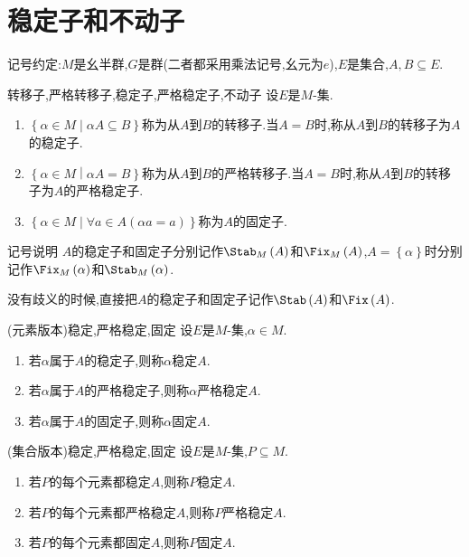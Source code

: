 \section{稳定子和不动子}

记号约定:$M$是幺半群,$G$是群(二者都采用乘法记号,幺元为$e$),$E$是集合,$A,B\subseteq E$.

\begin{definition}{转移子,严格转移子,稳定子,严格稳定子,不动子}{}
	设$E$是$M$-集.
	\begin{enumerate}
		\item $\left\{\alpha\in M\middle|\alpha A\subseteq B\right\}$称为从$A$到$B$的转移子.当$A=B$时,称从$A$到$B$的转移子为$A$的稳定子.
		\item $\left\{\alpha\in M\middle|\alpha A=B\right\}$称为从$A$到$B$的严格转移子.当$A=B$时,称从$A$到$B$的转移子为$A$的严格稳定子.
		\item $\left\{\alpha\in M\middle|\forall a\in A\left(\alpha a=a\right)\right\}$称为$A$的固定子.
	\end{enumerate}
\end{definition}

\begin{remark}{记号说明}{}
	$A$的稳定子和固定子分别记作$\Stab_{M}\left(A\right)$和$\Fix_{M}\left(A\right)$,$A=\left\{\alpha\right\}$时分别记作$\Fix_{M}\left(\alpha\right)$和$\Stab_{M}\left(\alpha\right)$.
	
	没有歧义的时候,直接把$A$的稳定子和固定子记作$\Stab\left(A\right)$和$\Fix\left(A\right)$.
\end{remark}

\begin{definition}{(元素版本)稳定,严格稳定,固定}{}
	设$E$是$M$-集,$\alpha\in M$.
	\begin{enumerate}
		\item 若$\alpha$属于$A$的稳定子,则称$\alpha$稳定$A$.
		\item 若$\alpha$属于$A$的严格稳定子,则称$\alpha$严格稳定$A$.
		\item 若$\alpha$属于$A$的固定子,则称$\alpha$固定$A$.
	\end{enumerate}
\end{definition}

\begin{definition}{(集合版本)稳定,严格稳定,固定}{}
	设$E$是$M$-集,$P\subseteq M$.
	\begin{enumerate}
		\item 若$P$的每个元素都稳定$A$,则称$P$稳定$A$.
		\item 若$P$的每个元素都严格稳定$A$,则称$P$严格稳定$A$.
		\item 若$P$的每个元素都固定$A$,则称$P$固定$A$.
	\end{enumerate}
\end{definition}

